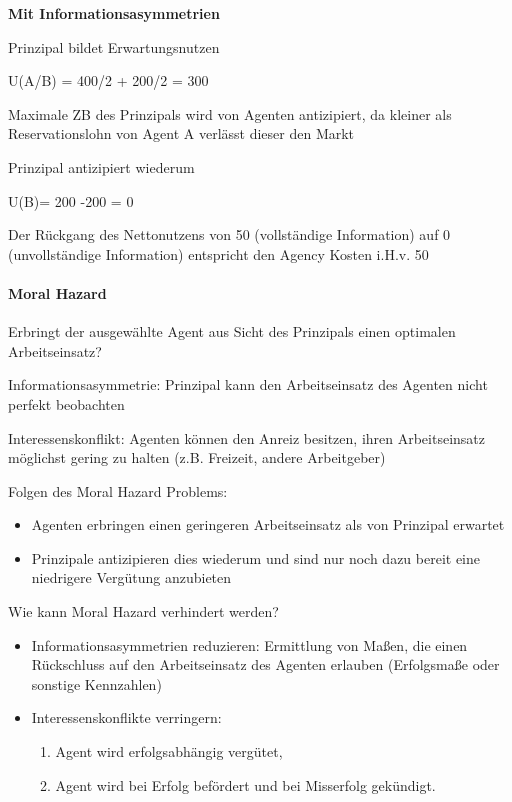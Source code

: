 \documentclass[
]{article}
\providecommand{\tightlist}{%
  \setlength{\itemsep}{0pt}\setlength{\parskip}{0pt}}
\begin{document}
\textbf{Mit Informationsasymmetrien}

Prinzipal bildet Erwartungsnutzen

U(A/B) = 400/2 + 200/2 = 300

Maximale ZB des Prinzipals wird von Agenten antizipiert, da kleiner als
Reservationslohn von Agent A verlässt dieser den Markt

Prinzipal antizipiert wiederum

U(B)= 200 -200 = 0

Der Rückgang des Nettonutzens von 50 (vollständige Information) auf 0
(unvollständige Information) entspricht den Agency Kosten i.H.v. 50

\hypertarget{moral-hazard}{%
\paragraph{Moral Hazard}\label{moral-hazard}}

Erbringt der ausgewählte Agent aus Sicht des Prinzipals einen optimalen
Arbeitseinsatz?

Informationsasymmetrie: Prinzipal kann den Arbeitseinsatz des Agenten
nicht perfekt beobachten

Interessenskonflikt: Agenten können den Anreiz besitzen, ihren
Arbeitseinsatz möglichst gering zu halten (z.B. Freizeit, andere
Arbeitgeber)

Folgen des Moral Hazard Problems:

\begin{itemize}
\tightlist
\item
  Agenten erbringen einen geringeren Arbeitseinsatz als von Prinzipal
  erwartet
\item
  Prinzipale antizipieren dies wiederum und sind nur noch dazu bereit
  eine niedrigere Vergütung anzubieten
\end{itemize}

Wie kann Moral Hazard verhindert werden?

\begin{itemize}
\tightlist
\item
  Informationsasymmetrien reduzieren: Ermittlung von Maßen, die einen
  Rückschluss auf den Arbeitseinsatz des Agenten erlauben (Erfolgsmaße
  oder sonstige Kennzahlen)
\item
  Interessenskonflikte verringern:

  \begin{enumerate}
  \def\labelenumi{\arabic{enumi}.}
  \tightlist
  \item
    Agent wird erfolgsabhängig vergütet,
  \item
    Agent wird bei Erfolg befördert und bei Misserfolg gekündigt.
  \end{enumerate}
\end{itemize}
\end{document}
